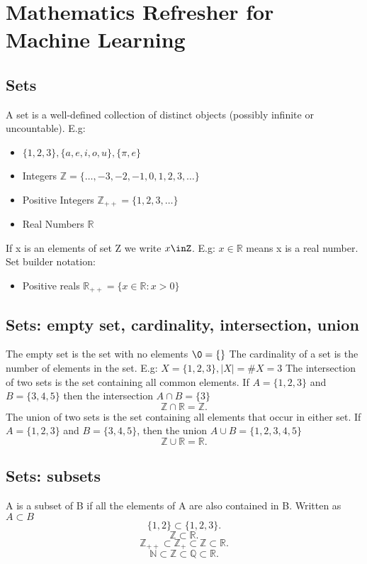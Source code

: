 \documentclass[a4paper]{article}
\newcommand{\R}{\mathbb{R}}
\newcommand{\Z}{\mathbb{Z}}
\newcommand{\N}{\mathbb{N}}
\newcommand{\Q}{\mathbb{Q}}
\begin{document}
	\section{Mathematics Refresher for Machine Learning}
	\subsection{Sets}
	A set is a well-defined collection of distinct objects (possibly infinite or uncountable).
	E.g:
	\begin{itemize}
		\item $\{1,2,3\}, \{a,e,i,o,u\}, \{\pi,e\}  $
		\item Integers $\Z = \{\ldots,-3,-2,-1,0,1,2,3,\ldots\}$
		\item Positive Integers $\Z_{++} = \{1,2,3,\ldots\} $
		\item Real Numbers $\R$
	\end{itemize}
	If x is an elements of set Z we write $x\inZ$.
	E.g: $x\in\R$ means x is a real number.
	Set builder notation:
	\begin{itemize}
		\item Positive reals $\R_{++} = \{x\in\R: x>0\} $
	\end{itemize}
	\subsection{Sets: empty set, cardinality, intersection, union}
	The empty set is the set with no elements $\0 = \{\} $
	The cardinality of a set is the number of elements in the set.
	E.g: $X = \{1,2,3\}, |X|=\#X=3$ 
	The intersection of two sets is the set containing all common elements.
	If $A = \{1,2,3\}$ and $B = \{3,4,5\}$ then the intersection $A\cap B = \{3\} $
	\[
		\Z \cap \R = \Z
	.\]
	The union of two sets is the set containing all elements that occur in either set.
	If $A = \{1,2,3\} $ and $B = \{3,4,5\} $, then the union $A \cup B = \{1,2,3,4,5\} $ 
	\[
		\Z \cup \R = \R
	.\]
	\subsection{Sets: subsets}
	A is a subset of B if all the elements of A are also contained in B.
	Written as $A \subset B$ 
	\[
		\{1,2\} \subset \{1,2,3\}
	.\]
	\[
		\Z \subset \R
	.\]
	\[
		\Z_{++} \subset \Z_+ \subset \Z \subset \R
	.\]
	\[
		\N \subset \Z \subset \Q \subset \R
	.\]
\end{document}
